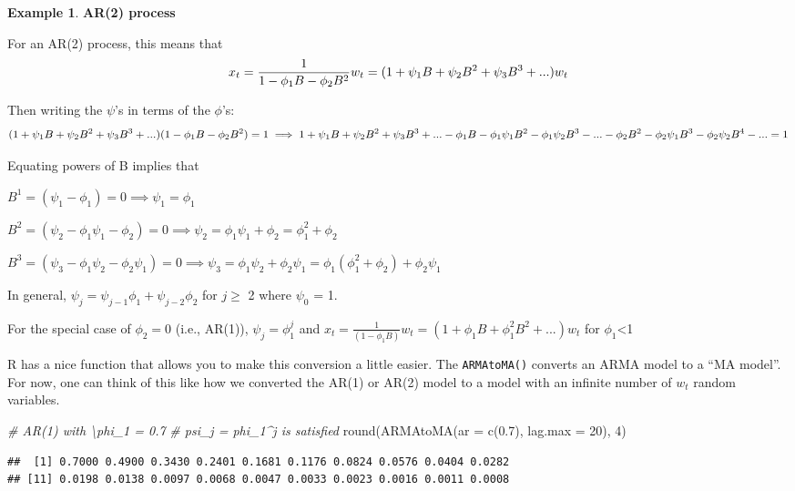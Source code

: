 \documentclass[
]{book}
\newenvironment{Shaded}{\begin{snugshade}}{\end{snugshade}}
\newcommand{\AttributeTok}[1]{\textcolor[rgb]{0.77,0.63,0.00}{#1}}
\newcommand{\CommentTok}[1]{\textcolor[rgb]{0.56,0.35,0.01}{\textit{#1}}}
\newcommand{\DecValTok}[1]{\textcolor[rgb]{0.00,0.00,0.81}{#1}}
\newcommand{\FloatTok}[1]{\textcolor[rgb]{0.00,0.00,0.81}{#1}}
\newcommand{\FunctionTok}[1]{\textcolor[rgb]{0.00,0.00,0.00}{#1}}
\newcommand{\NormalTok}[1]{#1}
\theoremstyle{definition}
\theoremstyle{definition}
\newtheorem{example}{Example}[chapter]
\theoremstyle{definition}
\theoremstyle{definition}
\theoremstyle{remark}
\begin{document}
\begin{example}
\textbf{AR(2) process}

For an AR(2) process, this means that \[x_t=\frac{1}{1-\phi_1B-\phi_2B^2}w_t\\
=(1+\psi_1B+\psi_2B^2+\psi_3B^3+...)w_t\]

Then writing the \(\psi\)'s in terms of the \(\phi\)'s:
\[(1+\psi_1B+\psi_2B^2+\psi_3B^3+...)(1-\phi_1B-\phi_2B^2)=1\\
\implies 1+\psi_1B+\psi_2B^2+\psi_3B^3+...\\
-\phi_1B-\phi_1\psi_1B^2-\phi_1\psi_2B^3-...\\
-\phi_2B^2-\phi_2\psi_1B^3-\phi_2\psi_2B^4-...=1\]

Equating powers of B implies that

\(B^1=(\psi_1-\phi_1)=0 \implies \psi_1=\phi_1\)

\(B^2=(\psi_2-\phi_1\psi_1-\phi_2)=0 \implies \psi_2=\phi_1\psi_1+\phi_2=\phi_1^2+\phi_2\)

\(B^3=(\psi_3-\phi_1\psi_2-\phi_2\psi_1)=0 \implies \psi_3=\phi_1\psi_2+\phi_2\psi_1=\phi_1(\phi_1^2+\phi_2)+\phi_2\psi_1\)

In general, \(\psi_j = \psi_{j-1}\phi_1 + \psi_{j-2}\phi_2\) for \(j \ge\) 2 where \(\psi_0\) = 1.

For the special case of \(\phi_2 = 0\) (i.e., AR(1)), \(\psi_j = \phi_1^j\) and
\(x_t=\frac{1}{(1-\phi_1B)}w_t=(1+\phi_1B+\phi_1^2B^2+...)w_t\) for \textbar{}\(\phi_1\)\textbar\textless1
\end{example}

R has a nice function that allows you to make this conversion a little easier. The \texttt{ARMAtoMA()} converts an ARMA model to a ``MA model''. For now, one can think of this like how we converted the AR(1) or AR(2) model to a model with an infinite number of \(w_t\) random variables.

\begin{Shaded}
\begin{Highlighting}[]
\CommentTok{\# AR(1) with \textbackslash{}phi\_1 = 0.7}
\CommentTok{\# psi\_j = phi\_1\^{}j is satisfied}
\FunctionTok{round}\NormalTok{(}\FunctionTok{ARMAtoMA}\NormalTok{(}\AttributeTok{ar =} \FunctionTok{c}\NormalTok{(}\FloatTok{0.7}\NormalTok{), }\AttributeTok{lag.max =} \DecValTok{20}\NormalTok{), }\DecValTok{4}\NormalTok{)}
\end{Highlighting}
\end{Shaded}

\begin{verbatim}
##  [1] 0.7000 0.4900 0.3430 0.2401 0.1681 0.1176 0.0824 0.0576 0.0404 0.0282
## [11] 0.0198 0.0138 0.0097 0.0068 0.0047 0.0033 0.0023 0.0016 0.0011 0.0008
\end{verbatim}
\end{document}
